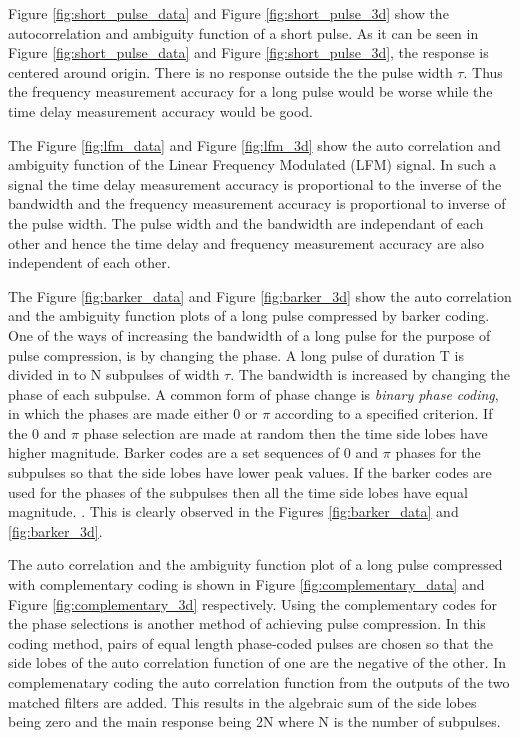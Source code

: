 \documentclass{article}
\begin{document}
Figure \ref{fig:short_pulse_data} and Figure \ref{fig:short_pulse_3d} show the autocorrelation and ambiguity function of a short pulse. As it can be seen in Figure \ref{fig:short_pulse_data} and Figure \ref{fig:short_pulse_3d}, the response is centered around origin. There is no response outside the the pulse width $\tau$. Thus the frequency measurement accuracy for a long pulse would be worse while the time delay measurement accuracy would be good. \cite{Skolnik:2001irs}

The Figure \ref{fig:lfm_data} and Figure \ref{fig:lfm_3d} show the auto correlation and ambiguity function of the Linear Frequency Modulated (LFM) signal. In such a signal the time delay measurement accuracy is proportional to the inverse of the bandwidth and the frequency measurement accuracy is proportional to inverse of the pulse width.  The pulse width and the bandwidth are independant of each other and hence the time delay and frequency measurement accuracy are also independent of each other.


The Figure \ref{fig:barker_data} and Figure \ref{fig:barker_3d} show the auto correlation and the ambiguity function plots of a long pulse compressed by barker coding. One of the ways of increasing the bandwidth of a long pulse for the purpose of pulse compression, is by changing the phase. A long pulse of duration T is divided in to N subpulses of width $\tau$. The bandwidth is increased by changing the phase of each subpulse. A common form of phase change is \textit{binary phase coding}, in which the phases are made either 0 or $\pi$ according to a specified criterion. If the 0 and $\pi$ phase selection are made at random then the time side lobes have higher magnitude. Barker codes are a set sequences of 0 and $\pi$ phases for the subpulses so that the side lobes have lower peak values. If the barker codes are used for the phases of the subpulses then all the time side lobes have equal magnitude. \cite{Skolnik:2001irs}. This is clearly observed in the Figures \ref{fig:barker_data} and \ref{fig:barker_3d}.


The auto correlation and the ambiguity function plot of a long pulse compressed with complementary coding is shown in Figure \ref{fig:complementary_data} and Figure \ref{fig:complementary_3d} respectively. Using the complementary codes for the phase selections is another method of achieving pulse compression. In this coding method, pairs of equal length phase-coded pulses are chosen so that the side lobes of the auto correlation function of one are the negative of the other. In complemenatary coding  the auto correlation function from the outputs of the two matched filters are added. This results in the algebraic sum of the side lobes being zero and the main response being 2N where N is the number of subpulses.
\end{document}
